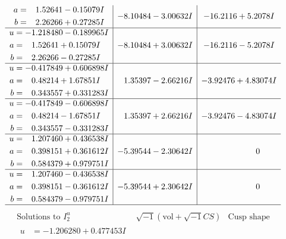 \documentclass[1p]{elsarticle_modified}
\theoremstyle{definition}
\newcommand{\I}{\sqrt{-1}}
\begin{document}
$$\begin{array}{c|c|c}
\begin{aligned}
a &= \phantom{-}1.52641 - 0.15079 I \\
b &= \phantom{-}2.26266 + 0.27285 I\end{aligned}
 & -8.10484 - 3.00632 I & -16.2116 + 5.2078 I \\ \hline\begin{aligned}
u &= -1.218480 - 0.189965 I \\
a &= \phantom{-}1.52641 + 0.15079 I \\
b &= \phantom{-}2.26266 - 0.27285 I\end{aligned}
 & -8.10484 + 3.00632 I & -16.2116 - 5.2078 I \\ \hline\begin{aligned}
u &= -0.417849 + 0.606898 I \\
a &= \phantom{-}0.48214 + 1.67851 I \\
b &= \phantom{-}0.343557 + 0.331283 I\end{aligned}
 & \phantom{-}1.35397 - 2.66216 I & -3.92476 + 4.83074 I \\ \hline\begin{aligned}
u &= -0.417849 - 0.606898 I \\
a &= \phantom{-}0.48214 - 1.67851 I \\
b &= \phantom{-}0.343557 - 0.331283 I\end{aligned}
 & \phantom{-}1.35397 + 2.66216 I & -3.92476 - 4.83074 I \\ \hline\begin{aligned}
u &= \phantom{-}1.207460 + 0.436538 I \\
a &= \phantom{-}0.398151 + 0.361612 I \\
b &= \phantom{-}0.584379 + 0.979751 I\end{aligned}
 & -5.39544 - 2.30642 I & \phantom{-0.000000 } 0 \\ \hline\begin{aligned}
u &= \phantom{-}1.207460 - 0.436538 I \\
a &= \phantom{-}0.398151 - 0.361612 I \\
b &= \phantom{-}0.584379 - 0.979751 I\end{aligned}
 & -5.39544 + 2.30642 I & \phantom{-0.000000 } 0\\
 \hline 
 \end{array}$$\newpage$$\begin{array}{c|c|c}  
\text{Solutions to }I^u_{2}& \I (\text{vol} + \sqrt{-1}CS) & \text{Cusp shape}\\
 \hline 
\begin{aligned}
u &= -1.206280 + 0.477453 I \\

\end{aligned}
\end{array}$$
\end{document}

